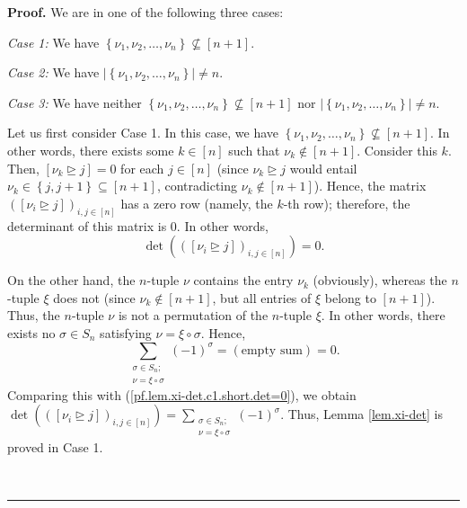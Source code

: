 \documentclass[numbers=enddot,12pt,final,onecolumn,notitlepage,english]{scrartcl}%
\theoremstyle{definition}
\newenvironment{proof}[1][Proof]{\noindent\textbf{#1.} }{\ \rule{0.5em}{0.5em}}
\let\sumnonlimits\sum
\renewcommand{\sum}{\sumnonlimits\limits}
\newenvironment{vershort}{}{}
\begin{document}
\begin{proof}
We are in one of the following three cases:

\textit{Case 1:} We have $\left\{  \nu_{1},\nu_{2},\ldots,\nu_{n}\right\}
\not \subseteq \left[  n+1\right]  $.

\textit{Case 2:} We have $\left\vert \left\{  \nu_{1},\nu_{2},\ldots,\nu
_{n}\right\}  \right\vert \neq n$.

\textit{Case 3:} We have neither $\left\{  \nu_{1},\nu_{2},\ldots,\nu
_{n}\right\}  \not \subseteq \left[  n+1\right]  $ nor $\left\vert \left\{
\nu_{1},\nu_{2},\ldots,\nu_{n}\right\}  \right\vert \neq n$.\medskip

\begin{vershort}
Let us first consider Case 1. In this case, we have $\left\{  \nu_{1},\nu
_{2},\ldots,\nu_{n}\right\}  \not \subseteq \left[  n+1\right]  $. In other
words, there exists some $k\in\left[  n\right]  $ such that $\nu_{k}%
\notin\left[  n+1\right]  $. Consider this $k$. Then, $\left[  \nu
_{k}\trianglerighteq j\right]  =0$ for each $j\in\left[  n\right]  $ (since
$\nu_{k}\trianglerighteq j$ would entail $\nu_{k}\in\left\{  j,j+1\right\}
\subseteq\left[  n+1\right]  $, contradicting $\nu_{k}\notin\left[
n+1\right]  $). Hence, the matrix $\left(  \left[  \nu_{i}\trianglerighteq
j\right]  \right)  _{i,j\in\left[  n\right]  }$ has a zero row (namely, the
$k$-th row); therefore, the determinant of this matrix is $0$. In other
words,
\begin{equation}
\det\left(  \left(  \left[  \nu_{i}\trianglerighteq j\right]  \right)
_{i,j\in\left[  n\right]  }\right)  =0. \label{pf.lem.xi-det.c1.short.det=0}%
\end{equation}


On the other hand, the $n$-tuple $\nu$ contains the entry $\nu_{k}$
(obviously), whereas the $n$-tuple $\xi$ does not (since $\nu_{k}\notin\left[
n+1\right]  $, but all entries of $\xi$ belong to $\left[  n+1\right]  $).
Thus, the $n$-tuple $\nu$ is not a permutation of the $n$-tuple $\xi$. In
other words, there exists no $\sigma\in S_{n}$ satisfying $\nu=\xi\circ\sigma
$. Hence,%
\[
\sum_{\substack{\sigma\in S_{n};\\\nu=\xi\circ\sigma}}\left(  -1\right)
^{\sigma}=\left(  \text{empty sum}\right)  =0.
\]
Comparing this with (\ref{pf.lem.xi-det.c1.short.det=0}), we obtain
$\det\left(  \left(  \left[  \nu_{i}\trianglerighteq j\right]  \right)
_{i,j\in\left[  n\right]  }\right)  =\sum_{\substack{\sigma\in S_{n};\\\nu
=\xi\circ\sigma}}\left(  -1\right)  ^{\sigma}$. Thus, Lemma \ref{lem.xi-det}
is proved in Case 1. \medskip
\end{vershort}


\end{proof}
\end{document}
